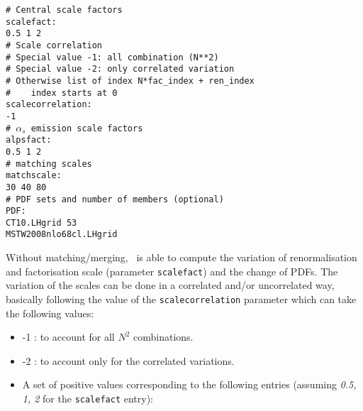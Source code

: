 {\footnotesize
\texttt{\# Central scale factors \\
scalefact: \\
0.5 1 2\\
\# Scale correlation \\
\# Special value -1: all combination (N**2)\\
\# Special value -2: only correlated variation\\
\# Otherwise list of index N*fac\_index + ren\_index\\
\#\ \ \ \ index starts at 0\\
scalecorrelation: \\
-1 \\
\#   $\alpha_s$ emission scale factors \\
alpsfact:\\
0.5 1 2\\
\#   matching scales\\
matchscale:\\
30 40 80\\
\# PDF sets and number of members (optional)\\
PDF:\\
CT10.LHgrid 53\\
MSTW2008nlo68cl.LHgrid\\[3mm]}
}


Without matching/merging, \syscalc\ is able to compute the variation of renormalisation and factorisation scale (parameter \texttt{scalefact}) and the change of PDFs.
The variation of the scales can be done in a correlated and/or uncorrelated way, basically following the value of the \texttt{scalecorrelation} parameter which can take the following values:
\begin{itemize}
\item  -1 : to account for all $N^2$ combinations.
\item  -2 : to account only for the correlated variations.
\item A set of positive values corresponding to the following entries (assuming \emph{0.5, 1, 2} for the  \texttt{scalefact} entry):
\end{itemize}

